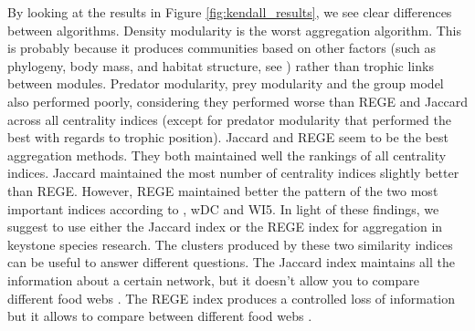 	By looking at the results in Figure \ref{fig:kendall_results}, we see clear differences between algorithms. Density modularity is the worst aggregation algorithm. This is probably because it produces communities based on other factors (such as phylogeny, body mass, and habitat structure, see \citet{Rezende2009}) rather than trophic links between modules. Predator modularity, prey modularity and the group model also performed poorly, considering they performed worse than REGE and Jaccard across all centrality indices (except for predator modularity that performed the best with regards to trophic position). Jaccard and REGE seem to be the best aggregation methods.	They both maintained well the rankings of all centrality indices.	Jaccard maintained the most number of centrality indices slightly better than REGE.	However, REGE maintained better the pattern of the two most important indices according to \citet{Gouveia2020}, wDC and WI5. In light of these findings, we suggest to use either the Jaccard index or the REGE index for aggregation in keystone species research. The clusters produced by these two similarity indices can be useful to answer different questions. The Jaccard index maintains all the information about a certain network, but it doesn't allow you to compare different food webs \citep{Luczkovich2003}. The REGE index produces a controlled loss of information but it allows to compare between different food webs \citep{Luczkovich2003}.

